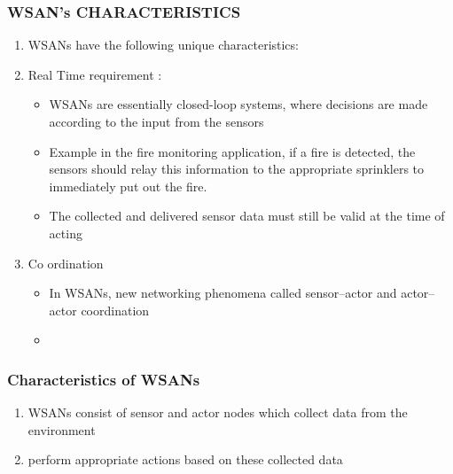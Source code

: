 \documentclass[11pt]{class}
\begin{document}
		\begin{frame}
			\frametitle{WSAN's CHARACTERISTICS}
			\begin{enumerate}
				\item WSANs have the following unique characteristics:
						\item Real Time requirement :
						\begin{itemize}
							\item  WSANs are essentially closed-loop systems, where decisions are made according to the input from the sensors
							\item Example in the fire monitoring application, if a fire is detected, the sensors should relay this information to the appropriate sprinklers to immediately put out the fire. 
							\item The collected and delivered sensor data must still be valid at the time of acting
						\end{itemize}
						\item Co ordination
							\begin{itemize}
								\item In WSANs, new networking phenomena called sensor–actor and actor–actor coordination 
								\item 
							\end{itemize}
						
							\end{enumerate}
						\end{frame}
						\begin{frame}
							\frametitle{Characteristics of WSANs}
							\begin{enumerate}
								\item WSANs consist of sensor and actor nodes which collect data from the environment
								\item perform appropriate actions based on these collected data
							\end{enumerate}
								\end{frame}
\end{document}

